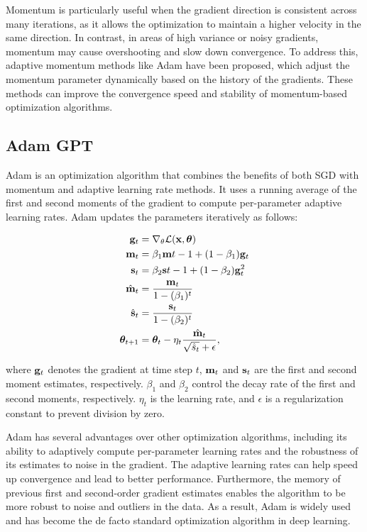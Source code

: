 Momentum is particularly useful when the gradient direction is consistent across many iterations, as it allows the optimization to maintain a higher velocity in the same direction.
In contrast, in areas of high variance or noisy gradients, momentum may cause overshooting and slow down convergence.
To address this, adaptive momentum methods like Adam have been proposed, which adjust the momentum parameter dynamically based on the history of the gradients.
These methods can improve the convergence speed and stability of momentum-based optimization algorithms.


\subsection{Adam GPT}
Adam is an optimization algorithm that combines the benefits of both SGD with momentum and adaptive learning rate methods.
It uses a running average of the first and second moments of the gradient to compute per-parameter adaptive learning rates.
Adam updates the parameters iteratively as follows:

\begin{align}
\bold{g}_t &= \nabla_\theta \mathcal{L}(\bold{x}, \boldsymbol{\theta}) \\
\bold{m}_t &= \beta_1 \bold{m}{t-1} + (1-\beta_1) \bold{g}_t \\
\bold{s}_t &= \beta_2 \bold{s}{t-1} + (1-\beta_2) \bold{g}_t^2\\
\hat{\bold{m}}_t &= \frac{\bold{m}_t}{1 - (\beta_1)^t} \\
\hat{\bold{s}}_t &= \frac{\bold{s}_t}{1 - (\beta_2)^t} \\
\boldsymbol{\theta}_{t+1} &= \boldsymbol{\theta}_t - \eta_t \frac{\hat{\bold{m}}_t}{\sqrt{\hat{s}_t} + \epsilon},
\end{align}

where $\bold{g}_t$ denotes the gradient at time step $t$, $\bold{m}_t$ and $\bold{s}_t$ are the first and second moment estimates, respectively.
$\beta_1$ and $\beta_2$ control the decay rate of the first and second moments, respectively.
$\eta_t$ is the learning rate, and $\epsilon$ is a regularization constant to prevent division by zero.

Adam has several advantages over other optimization algorithms, including its ability to adaptively compute per-parameter learning rates and the robustness of its estimates to noise in the gradient.
The adaptive learning rates can help speed up convergence and lead to better performance.
Furthermore, the memory of previous first and second-order gradient estimates enables the algorithm to be more robust to noise and outliers in the data.
As a result, Adam is widely used and has become the de facto standard optimization algorithm in deep learning.


